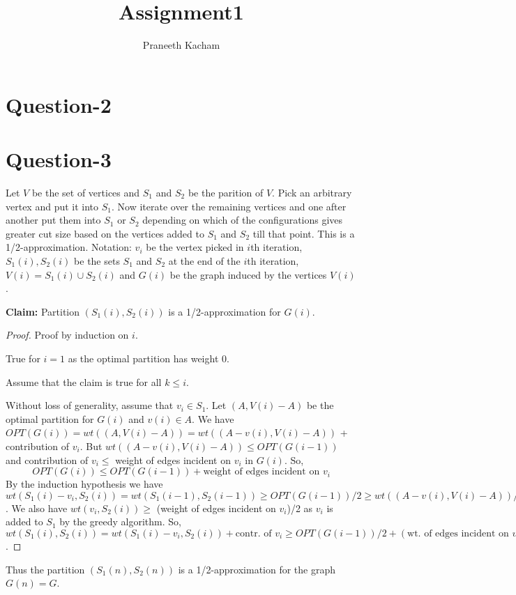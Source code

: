 \documentclass{article}
\title{Assignment1}
\author{Praneeth Kacham}
\date{}
\begin{document}
\maketitle
\section{Question-2}

\section{Question-3}
Let $V$ be the set of vertices and $S_1$ and $S_2$ be the parition of $V$. Pick an arbitrary vertex and put it into $S_1$. Now iterate over the remaining vertices and one after another put them into $S_1$ or
$S_2$ depending on which of the configurations gives greater cut size based on the vertices added to $S_1$ and $S_2$ till that point. This is a 1/2-approximation. 
Notation: $v_i$ be the vertex picked in $i$th iteration, $S_1(i), S_2(i)$ be the sets $S_1$ and $S_2$ at the end of the $i$th iteration, $V(i) = S_1(i) \cup S_2(i)$ and $G(i)$ be the graph induced by the vertices $V(i)$.

\noindent
\textbf{Claim:} Partition $(S_1(i),S_2(i))$ is a 1/2-approximation for $G(i)$. 
\begin{proof}
    Proof by induction on $i$.

    True for $i = 1$ as the optimal partition has weight $0$.
    
    Assume that the claim is true for all $k \leq i$.
    
    Without loss of generality, assume that $v_i \in S_1$. Let $(A,V(i)-A)$ be the optimal partition for $G(i)$ and $v(i) \in A$. We have $OPT(G(i)) = wt((A,V(i)-A)) = wt((A-v(i),V(i)-A))$ + contribution of $v_i$. 
    But $wt((A-v(i),V(i)-A)) \leq OPT(G(i-1))$ and contribution of $v_i \leq{}$ weight of edges incident on $v_i$ in $G(i)$. So,
    \begin{equation}
        OPT(G(i)) \leq OPT(G(i-1)) + \text{weight of edges incident on }v_i
    \end{equation}
        By the induction hypothesis we have $ wt(S_1(i)-v_i, S_2(i)) = wt(S_1(i-1),S_2(i-1)) \geq  OPT(G(i-1))/2 \geq wt((A-v(i),V(i)-A))/2$. We also have $wt(v_i,S_2(i)) \geq $ (weight of edges incident on $v_i$)/2 as $v_i$ is added to $S_1$ by the greedy algorithm. So, $wt(S_1(i),S_2(i)) = wt(S_1(i)-v_i,S_2(i)) + \text{contr. of } v_i \geq OPT(G(i-1))/2 + (\text{wt. of edges incident on } v_i)/2 \geq OPT(G(i))/2$.
\end{proof}
Thus the partition $(S_1(n),S_2(n))$ is a 1/2-approximation for the graph $G(n) = G$.
\end{document}
